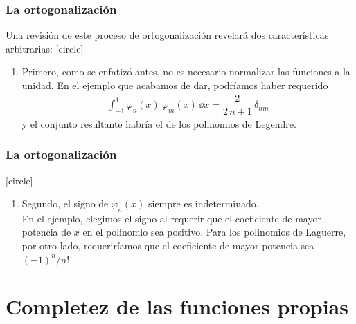 \begin{frame}
\frametitle{La ortogonalización}
Una revisión de este proceso de ortogonalización revelará dos características arbitrarias:
[circle]
\fontsize{12}{12}\selectfont
\begin{enumerate}
\item Primero, como se enfatizó antes, no es necesario normalizar las funciones a la unidad.
En el ejemplo que acabamos de dar, podríamos haber requerido
\begin{align}
\int_{-1}^{1} \varphi_{n} (x) \: \varphi_{m} (x) \, \dd{x} = \dfrac{2}{2 \, n +1} \, \delta_{nm}
\label{eq:ecuacion_10_61}
\end{align}
y el conjunto resultante habría el de los polinomios de Legendre.
\seti
\end{enumerate}
\end{frame}
\begin{frame}
\frametitle{La ortogonalización}
[circle]
\begin{enumerate}
\conti
\item Segundo, el signo de $\varphi_{n} (x)$ siempre es indeterminado.
\\
En el ejemplo, elegimos el signo al requerir que el coeficiente de mayor potencia de $x$ en el polinomio sea positivo. Para los polinomios de Laguerre, por otro lado, requeriríamos que el coeficiente de mayor potencia sea $(-1)^{n}/n!$
\end{enumerate}
\end{frame}
\section{Completez de las funciones propias}

